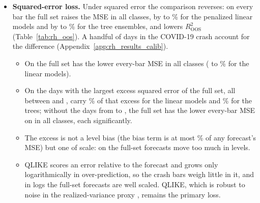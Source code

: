 \begin{itemize}
\begin{itemize}
    LightGBM, \rhabXgbFullAllPct\% for XGBoost and \rhabRfFullAllPct\% for the random forest ($\DM={}$\rhorDmLgbmB,
    \rhorDmXgbB{} and \rhorDmRfB). %
  \end{itemize}
\item \textbf{Squared-error loss.} Under squared error the comparison reverses: on every bar the full set raises the
  MSE in all \rhorAfPairs{} classes, by \rhcaLinMsePctBarSpanMin{} to \rhcaLinMsePctBarSpanMax\% for the penalized
  linear models and by \rhcaTreeMsePctBarSpanMin{} to \rhcaTreeMsePctBarSpanMax\% for the tree ensembles, and lowers
  $R^2_{\mathrm{OOS}}$ (Table~\ref{tab:rh_oos}). A handful of days in the COVID-19 crash account for the difference
  (Appendix~\ref{app:rh_results_calib}).
  \begin{itemize}
  \item On \rhcaYearsPre{} the full set has the lower every-bar MSE in all classes (\rhcaLinMsePctBarPreMin{} to
    \rhcaLinMsePctBarPreMax\% for the linear models).
  \item On \rhcaYearsOos{} the \rhcaTopDays{} days with the largest excess squared error of the full set, all between
    \rhcaTopFirstBarOos{} and \rhcaTopLastBarOos, carry \rhcaLinTopShareBarOosRng\% of that excess for the linear
    models and \rhcaTreeTopShareBarOosRng\% for the trees; without the days from \rhcaCrashStart{} to \rhcaCrashEnd,
    the full set has the lower every-bar MSE on \rhcaYearsOos{} in all classes, each significantly.
  \item The excess is not a level bias (the bias term is at most \rhcaAllShBiasBarOosMax\% of any forecast's MSE) but
    one of scale: on \rhcaYearsOos{} the full-set forecasts move too much in levels.
  \item QLIKE scores an error relative to the forecast and grows only logarithmically in over-prediction, so the crash
    bars weigh little in it, and in logs the full-set forecasts are well scaled. QLIKE, which is robust to noise in
    the realized-variance proxy \citep{Patton2011}, remains the primary loss.
  \end{itemize}
\end{itemize}

